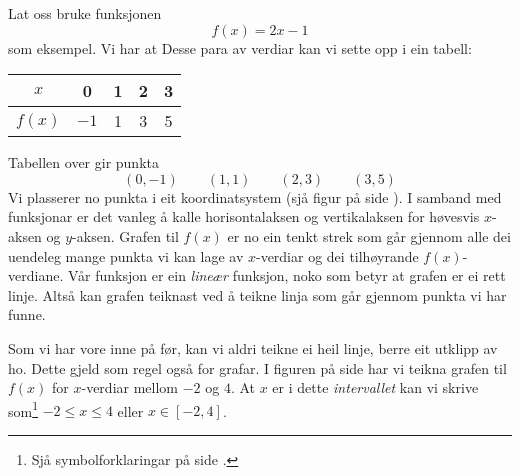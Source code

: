 Lat oss bruke funksjonen 
\[ f(x)=2x-1 \]
som eksempel. Vi har at
Desse para av verdiar kan vi sette opp i ein tabell:
	\begin{center}
	\begin{tabular}{c | c |c |c|c}
		$ x $ & 0 & 1 & 2 & 3 \\ \hline
		$ f(x) $ &$  -1 $ & 1&3 &5
	\end{tabular}
\end{center}
Tabellen over gir punkta
\[ (0, -1)\quad\quad(1, 1)\quad\quad(2, 3)\quad\quad(3, 5) \]
Vi plasserer no punkta i eit koordinatsystem (sjå figur på side \pageref{funkfig}). I samband med funksjonar er det vanleg å kalle horisontalaksen og vertikalaksen for høvesvis $ x $-aksen og $ y $-aksen. 
Grafen til $ f(x) $ er no ein tenkt strek som går gjennom alle dei uendeleg mange punkta vi kan lage av $ x$-verdiar og dei tilhøyrande $ f(x) $-verdiane. Vår funksjon er ein \textit{lineær} funksjon, noko som betyr at grafen er ei rett linje. Altså kan grafen teiknast ved å teikne linja som går gjennom punkta vi har funne.\vsk

Som vi har vore inne på før, kan vi aldri teikne ei heil linje, berre eit utklipp av ho. Dette gjeld som regel også for grafar. I figuren på side \pageref{funkfig} har vi teikna grafen til $ f(x) $ for $ x $-verdiar mellom $ -2 $ og $ 4 $. At $ x $ er i dette \textit{intervallet} kan vi skrive som\footnote{Sjå symbolforklaringar på side \pageref{Symbol}.} $ -2\leq x\leq 4 $ eller $ x\in[-2, 4] $.
 \label{funkfig}

